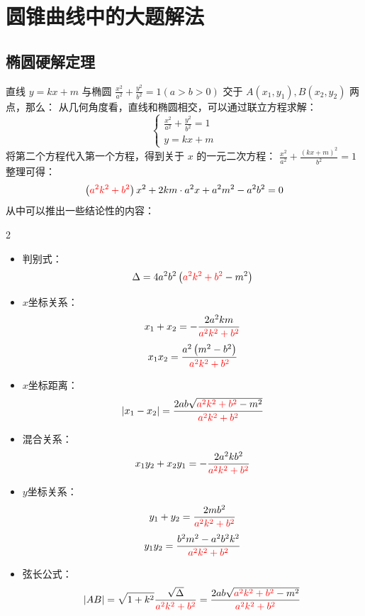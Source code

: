 \section{圆锥曲线中的大题解法}

\subsection{椭圆硬解定理}

\begin{theorem}[硬解定理]
    直线 $y=k x+m$ 与椭圆 $\frac{x^2}{a^2}+\frac{y^2}{b^2}=1(a>b>0)$ 交于 $A\left(x_1, y_1\right), B\left(x_2, y_2\right)$ 两点，那么：
    从几何角度看，直线和椭圆相交，可以通过联立方程求解：
    $$
        \begin{cases}
            \frac{x^2}{a^2}+\frac{y^2}{b^2}=1 \\
            y=kx+m
        \end{cases}
    $$
    将第二个方程代入第一个方程，得到关于 $x$ 的一元二次方程：
    $\frac{x^2}{a^2}+\frac{(kx+m)^2}{b^2}=1$
    整理可得：
    $$\left(\textcolor{red}{a^2 k^2+b^2}\right) x^2+2 k m \cdot a^2 x+a^2 m^2-a^2 b^2=0$$
    从中可以推出一些结论性的内容：
    \begin{multicols}{2}
        \begin{itemize}
            \item 判别式：
                  $$\Delta=4 a^2 b^2\left(\textcolor{red}{a^2 k^2+b^2}-m^2\right)$$

            \item $x$坐标关系：
                  $$x_1+x_2=-\frac{2 a^2 k m}{\textcolor{red}{a^2 k^2+b^2}}$$
                  $$x_1 x_2=\frac{a^2\left(m^2-b^2\right)}{\textcolor{red}{a^2 k^2+b^2}}$$

            \item $x$坐标距离：
                  $$\left|x_1-x_2\right|=\frac{2 a b \sqrt{\textcolor{red}{a^2 k^2+b^2}-m^2}}{{\textcolor{red}{a^2 k^2+b^2}}}$$

            \item 混合关系：
                  $$x_1 y_2+x_2 y_1=-\frac{2 a^2 k b^2}{\textcolor{red}{a^2 k^2+b^2}}$$
            \item $y$坐标关系：
                  $$y_1+y_2=\frac{2 m b^2}{\textcolor{red}{a^2 k^2+b^2}}$$
                  $$y_1 y_2=\frac{b^2 m^2-a^2 b^2 k^2}{\textcolor{red}{a^2 k^2+b^2}}$$
            \item 弦长公式：
                  $$|AB|=\sqrt{1+k^2}\frac{\sqrt{\Delta}}{\textcolor{red}{a^2 k^2+b^2}}=\frac{2ab\sqrt{\textcolor{red}{a^2 k^2+b^2}-m^2}}{\textcolor{red}{a^2 k^2+b^2}}$$
        \end{itemize}
    \end{multicols}
\end{theorem}

